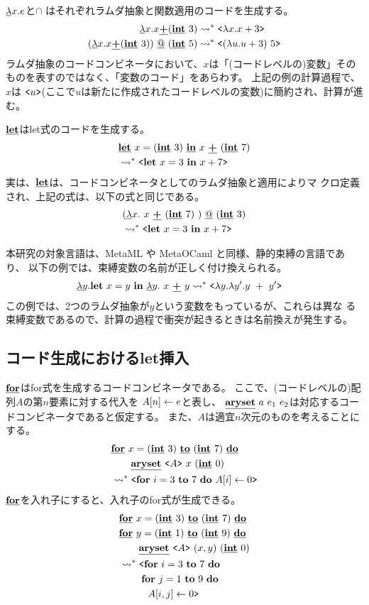 $\cfun{x}{e}$と$\cap$ はそれぞれラムダ抽象と関数適用のコードを生成する。
\begin{align*}
\cfun{x}{x \cPlus (\cint~3)}   & \too \code{\fun{x}{x+3}} \\
(\cfun{x}{x \cPlus (\cint~3)}) \cat (\cint~5) & \too 
\code{(\fun{u}{u+3})~5}
\end{align*}
ラムダ抽象のコードコンビネータにおいて、$x$は「(コードレベルの)変数」その
ものを表すのではなく、「変数のコード」をあらわす。
上記の例の計算過程で、$x$は
$\code{u}$(ここで$u$は新たに作成されたコードレベルの変数)に簡約され、計算が進む。

$\cLet$はlet式のコードを生成する。
\begin{align*}
& \clet{x}{(\cint~3)}{x~ \cPlus~ (\cint~7)} \\
  & \too \code{\Let~ x = 3~ \In~ x + 7} 
\end{align*}
実は、$\cLet$は、コードコンビネータとしてのラムダ抽象と適用によりマ
クロ定義され、上記の式は、以下の式と同じである。
\begin{align*}
& (\cfun{x}{~x~ \cPlus~ (\cint~7)~}) \cat (\cint~3)  \\
& \too \code{\Let~ x = 3~ \In~ x + 7} 
\end{align*}

本研究の対象言語は、MetaML や MetaOCaml と同様、静的束縛の言語であり、
以下の例では、束縛変数の名前が正しく付け換えられる。
\begin{align*}
\cfun{y}{\Let~ x = y~ \In~ \cfun{y}{~x~ \cPlus~ y}{}}{} 
& \too \code{\fun{y}{\fun{y'}{y~ +~ y'}}}
\end{align*}
この例では、2つのラムダ抽象が$y$という変数をもっているが、これらは異な
る束縛変数であるので、計算の過程で衝突が起きるときは名前換えが発生する。

\subsection{コード生成におけるlet挿入}

$\cFor$はfor式を生成するコードコンビネータである。
ここで、(コードレベルの)配列$A$の第$n$要素に対する代入を
$\aryset{A}{n}{e}$と表し、
$\caryset{a}{e_1}{e_2}$は対応するコードコンビネータであると仮定する。
また、$A$は適宜$n$次元のものを考えることにする。
\begin{align*}
& \cforin{x=(\cint~3)}{(\cint~7)} \\
& \qquad \caryset{\code{A}}{x}{(\cint~0)} \\
& \too \code{\forin{i=3}{7}~\aryset{A}{i}{0}}
\end{align*}
$\cFor$を入れ子にすると、入れ子のfor式が生成できる。
\begin{align*}
& \cforin{x=(\cint~3)}{(\cint~7)} \\
& \cforin{y=(\cint~1)}{(\cint~9)} \\
& \qquad \caryset{\code{A}}{(x,y)}{(\cint~0)} \\
& \too \codebegin \forin{i=3}{7} \\
& \phantom{\too \codebegin} \forin{j=1}{9} \\
& \phantom{\too \codebegin} ~~\aryset{A}{i,j}{0} \codeend
\end{align*}

